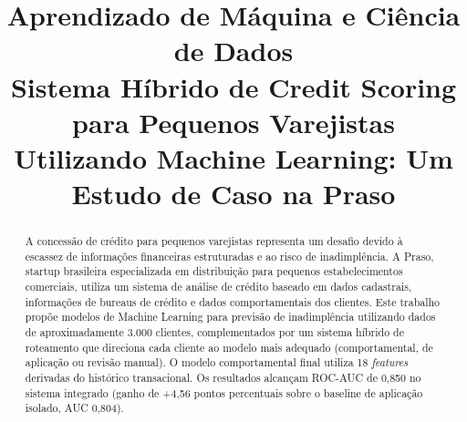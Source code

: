 \documentclass[conference]{IEEEtran}
\begin{document}
\title{Aprendizado de Máquina e Ciência de Dados\\
Sistema Híbrido de Credit Scoring para Pequenos Varejistas Utilizando Machine Learning: Um Estudo de Caso na Praso}

\author{
\and
{}
\and
{}
\and
{}
}

\maketitle

\begin{abstract}
A concessão de crédito para pequenos varejistas representa um desafio devido à escassez de informações financeiras estruturadas e ao risco de inadimplência. A Praso, startup brasileira especializada em distribuição para pequenos estabelecimentos comerciais, utiliza um sistema de análise de crédito baseado em dados cadastrais, informações de bureaus de crédito e dados comportamentais dos clientes. Este trabalho propõe modelos de Machine Learning para previsão de inadimplência utilizando dados de aproximadamente 3.000 clientes, complementados por um sistema híbrido de roteamento que direciona cada cliente ao modelo mais adequado (comportamental, de aplicação ou revisão manual). O modelo comportamental final utiliza 18 \textit{features} derivadas do histórico transacional. Os resultados alcançam ROC-AUC de 0,850 no sistema integrado (ganho de +4,56 pontos percentuais sobre o baseline de aplicação isolado, AUC 0,804).
\end{abstract}

\IEEEpeerreviewmaketitle
\end{document}

